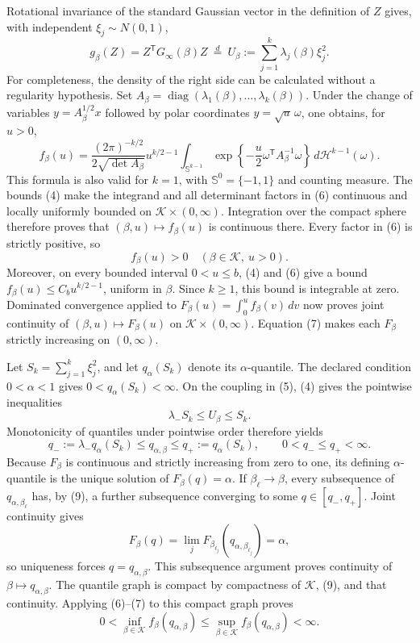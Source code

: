 Rotational invariance of the standard Gaussian vector in the definition of \(Z\) gives, with independent \(\xi_j\sim N(0,1)\),
\[
g_\beta(Z)=Z^{\mathsf T}G_\infty(\beta)Z
\ \stackrel{d}{=}\ 
U_\beta:=\sum_{j=1}^{k}\lambda_j(\beta)\xi_j^2.
\tag{5}
\]
For completeness, the density of the right side can be calculated without a regularity hypothesis.  Set
\(A_\beta=\operatorname{diag}(\lambda_1(\beta),\ldots,\lambda_k(\beta))\).  Under the change of variables \(y=A_\beta^{1/2}x\) followed by polar coordinates \(y=\sqrt u\,\omega\), one obtains, for \(u>0\),
\[
f_\beta(u)
=\frac{(2\pi)^{-k/2}}{2\sqrt{\det A_\beta}}
u^{k/2-1}
\int_{\mathbb S^{k-1}}
\exp\!\left\{-\frac u2\omega^{\mathsf T}A_\beta^{-1}\omega\right\}
\,d\mathcal H^{k-1}(\omega).
\tag{6}
\]
This formula is also valid for \(k=1\), with \(\mathbb S^0=\{-1,1\}\) and counting measure.  The bounds (4) make the integrand and all determinant factors in (6) continuous and locally uniformly bounded on \(\mathcal K\times(0,\infty)\).  Integration over the compact sphere therefore proves that \((\beta,u)\mapsto f_\beta(u)\) is continuous there.  Every factor in (6) is strictly positive, so
\[
f_\beta(u)>0
\quad(\beta\in\mathcal K,\ u>0).
\tag{7}
\]
Moreover, on every bounded interval \(0<u\leq b\), (4) and (6) give a bound \(f_\beta(u)\leq C_bu^{k/2-1}\), uniform in \(\beta\).  Since \(k\geq1\), this bound is integrable at zero.  Dominated convergence applied to
\(F_\beta(u)=\int_0^u f_\beta(v)\,dv\) now proves joint continuity of \((\beta,u)\mapsto F_\beta(u)\) on \(\mathcal K\times(0,\infty)\).  Equation (7) makes each \(F_\beta\) strictly increasing on \((0,\infty)\).

Let \(S_k=\sum_{j=1}^k\xi_j^2\), and let \(q_\alpha(S_k)\) denote its \(\alpha\)-quantile.  The declared condition \(0<\alpha<1\) gives \(0<q_\alpha(S_k)<\infty\).  On the coupling in (5), (4) gives the pointwise inequalities
\[
\lambda_-S_k\leq U_\beta\leq S_k.
\tag{8}
\]
Monotonicity of quantiles under pointwise order therefore yields
\[
q_-:=\lambda_-q_\alpha(S_k)
\leq q_{\alpha,\beta}
\leq q_+:=q_\alpha(S_k),
\qquad 0<q_-\leq q_+<\infty.
\tag{9}
\]
Because \(F_\beta\) is continuous and strictly increasing from zero to one, its defining \(\alpha\)-quantile is the unique solution of
\(F_\beta(q)=\alpha\).  If \(\beta_\ell\to\beta\), every subsequence of \(q_{\alpha,\beta_\ell}\) has, by (9), a further subsequence converging to some \(q\in[q_-,q_+]\).  Joint continuity gives
\[
F_\beta(q)
=\lim_jF_{\beta_{\ell_j}}(q_{\alpha,\beta_{\ell_j}})
=\alpha,
\tag{10}
\]
so uniqueness forces \(q=q_{\alpha,\beta}\).  This subsequence argument proves continuity of \(\beta\mapsto q_{\alpha,\beta}\).  The quantile graph is compact by compactness of \(\mathcal K\), (9), and that continuity.  Applying (6)--(7) to this compact graph proves
\[
0<\inf_{\beta\in\mathcal K}f_\beta(q_{\alpha,\beta})
\leq\sup_{\beta\in\mathcal K}f_\beta(q_{\alpha,\beta})<\infty.
\tag{11}
\]


